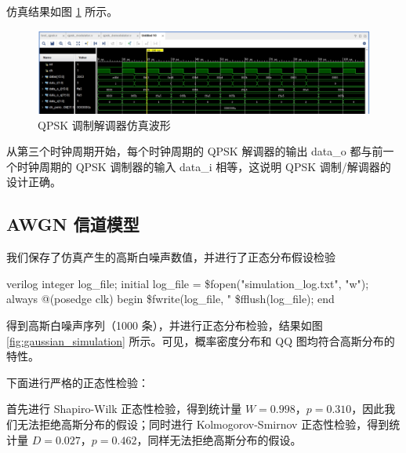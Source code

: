 仿真结果如图 \ref{fig:qpsk_simulation} 所示。

\begin{figure}[ht]
    \centering
    \includegraphics[width=1.0\textwidth]{static/qpsk.png}
    \caption{QPSK 调制解调器仿真波形}
    \label{fig:qpsk_simulation}
\end{figure}

从第三个时钟周期开始，每个时钟周期的 QPSK 解调器的输出 data\_o 都与前一个时钟周期的 QPSK 调制器的输入 data\_i 相等，这说明 QPSK 调制/解调器的设计正确。

\subsection{AWGN 信道模型}

我们保存了仿真产生的高斯白噪声数值，并进行了正态分布假设检验

\begin{codeblock}{verilog}
integer log_file;
initial log_file = \$fopen("simulation_log.txt", "w");
always @(posedge clk) begin
    \$fwrite(log_file, "%
    \$fflush(log_file);
end
\end{codeblock}

得到高斯白噪声序列（1000 条），并进行正态分布检验，结果如图 \ref{fig:gaussian_simulation} 所示。可见，概率密度分布和 QQ 图均符合高斯分布的特性。


下面进行严格的正态性检验：

首先进行 Shapiro-Wilk 正态性检验，得到统计量 $W = 0.998$，$p = 0.310$，因此我们无法拒绝高斯分布的假设；同时进行 Kolmogorov-Smirnov 正态性检验，得到统计量 $D = 0.027$，$p = 0.462$，同样无法拒绝高斯分布的假设。


